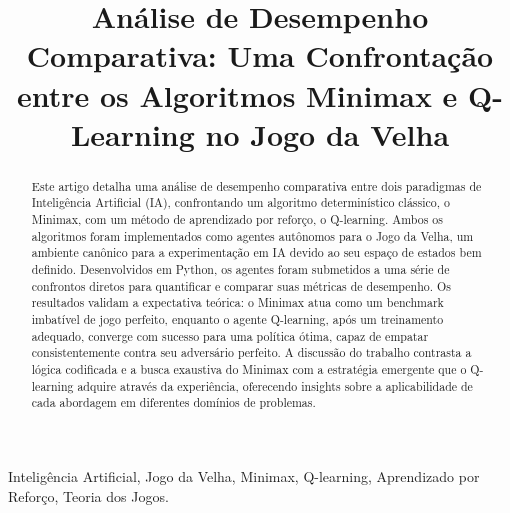 \documentclass[conference]{IEEEtran}
\begin{document}
\title{Análise de Desempenho Comparativa: Uma Confrontação entre os Algoritmos Minimax e Q-Learning no Jogo da Velha}

\author{
  \and
}

\maketitle

\begin{abstract}
Este artigo detalha uma análise de desempenho comparativa entre dois paradigmas de Inteligência Artificial (IA), confrontando um algoritmo determinístico clássico, o Minimax, com um método de aprendizado por reforço, o Q-learning. Ambos os algoritmos foram implementados como agentes autônomos para o Jogo da Velha, um ambiente canônico para a experimentação em IA devido ao seu espaço de estados bem definido. Desenvolvidos em Python, os agentes foram submetidos a uma série de confrontos diretos para quantificar e comparar suas métricas de desempenho. Os resultados validam a expectativa teórica: o Minimax atua como um benchmark imbatível de jogo perfeito, enquanto o agente Q-learning, após um treinamento adequado, converge com sucesso para uma política ótima, capaz de empatar consistentemente contra seu adversário perfeito. A discussão do trabalho contrasta a lógica codificada e a busca exaustiva do Minimax com a estratégia emergente que o Q-learning adquire através da experiência, oferecendo insights sobre a aplicabilidade de cada abordagem em diferentes domínios de problemas.
\end{abstract}

\begin{IEEEkeywords}
Inteligência Artificial, Jogo da Velha, Minimax, Q-learning, Aprendizado por Reforço, Teoria dos Jogos.
\end{IEEEkeywords}
\end{document}
